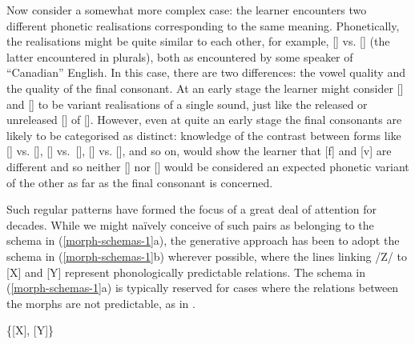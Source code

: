 Now consider a somewhat more complex case: the learner encounters two different phonetic realisations corresponding to the same meaning. Phonetically, the realisations might be quite similar to each other, for example, [] vs. [] (the latter encountered in plurals), both as encountered by some speaker of ``Canadian'' English. In this case, there are two differences: the vowel quality and the quality of the final consonant. At an early stage the learner might consider [] and [] to be variant realisations of a single sound, just like the released or unreleased [] of []. However, even at quite an early stage the final consonants are likely to be categorised as distinct: knowledge of the contrast between forms like %
[] vs. [], [] vs.\ [], [] vs. [], and so on, would show the learner that [f] and [v] are different and so neither [] nor [] would be considered an expected phonetic variant of the other as far as the final consonant is concerned.

Such regular patterns have formed the focus of a great deal of attention for decades. While we might naïvely conceive of such pairs as belonging to the schema in (\ref{morph-schemas-1}a), the generative approach has been to adopt the schema in (\ref{morph-schemas-1}b) wherever possible, where the lines linking /Z/ to [X] and [Y]  represent phonologically predictable relations. The schema in (\ref{morph-schemas-1}a) is typically reserved for cases where the relations between the morphs are not predictable, as in  \citet{Tranel:1996exceptionality, Bonet:2004, Bonet+:2007, Mascaro:2007, Nevins:2011}.

\begin{example} \label{morph-schemas-1}
\begin{multicols}{2}
\ea \{[X], [Y]\} 
\ex {}
\z
\end{multicols}
\end{example}



